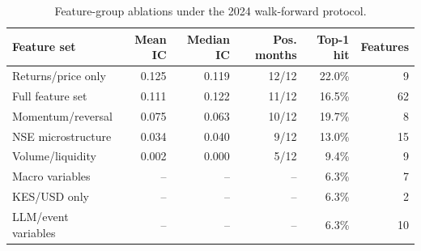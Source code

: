 \begin{table}[t]
\centering
\caption{Feature-group ablations under the 2024 walk-forward protocol.}
\label{tab:ablations}
\small
\begin{tabular}{@{}lrrrrr@{}}
\toprule
Feature set & Mean IC & Median IC & Pos. months & Top-1 hit & Features \\
\midrule
Returns/price only & 0.125 & 0.119 & 12/12 & 22.0\% & 9 \\
Full feature set & 0.111 & 0.122 & 11/12 & 16.5\% & 62 \\
Momentum/reversal & 0.075 & 0.063 & 10/12 & 19.7\% & 8 \\
NSE microstructure & 0.034 & 0.040 & 9/12 & 13.0\% & 15 \\
Volume/liquidity & 0.002 & 0.000 & 5/12 & 9.4\% & 9 \\
Macro variables & -- & -- & -- & 6.3\% & 7 \\
KES/USD only & -- & -- & -- & 6.3\% & 2 \\
LLM/event variables & -- & -- & -- & 6.3\% & 10 \\
\bottomrule
\end{tabular}
\end{table}
